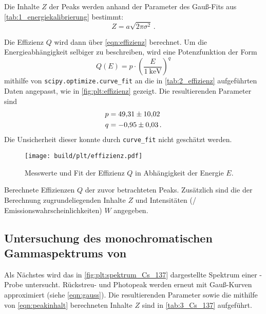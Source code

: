 Die Inhalte $Z$ der Peaks werden anhand der Parameter des Gauß-Fits aus \autoref{tab:1_energiekalibrierung} bestimmt:
\begin{equation}
    Z = a \sqrt{2\pi \sigma^2} \, .
    \label{eqn:peakinhalt}
\end{equation}

 \label{sec:auswertung:effizienz:effizienz}
Die Effizienz $Q$ wird dann über \autoref{eqn:effizienz} berechnet.
Um die Energieabhängigkeit selbiger zu beschreiben,
wird eine Potenzfunktion der Form
\begin{equation*}
    Q(E) = p \cdot \left(\frac{E}{\SI{1}{\kilo\electronvolt}}\right)^q
\end{equation*}
mithilfe von \texttt{scipy.optimize.curve\_fit} an die in \autoref{tab:2_effizienz} aufgeführten Daten angepasst,
wie in \autoref{fig:plt:effizienz} gezeigt.
Die resultierenden Parameter sind
\begin{align*}
    p &= \num{49.31 \pm 10.02} \\
    q &= \num{-0.95 \pm 0.03} \, .
\end{align*}
Die Unsicherheit dieser konnte durch \texttt{curve\_fit} nicht geschätzt werden.

\begin{figure}
    \centering
    \texttt{[image: build/plt/effizienz.pdf]}
    \caption{Messwerte und Fit der Effizienz $Q$ in Abhängigkeit der Energie $E$.}
    \label{fig:plt:effizienz}
\end{figure}

\begin{table}
    \centering
    \caption{
        Berechnete Effizienzen $Q$ der zuvor betrachteten Peaks.
        Zusätzlich sind die der Berechnung zugrundeliegenden
            Inhalte $Z$ und
            Intensitäten (/ Emissionswahrscheinlichkeiten) $W$ \cite{lara}
        angegeben.
    }
    \label{tab:2_effizienz}
\end{table}


\FloatBarrier %
\subsection{Untersuchung des monochromatischen Gammaspektrums von } \label{sec:auswertung:Cs_137}
Als Nächstes wird das
    in \autoref{fig:plt:spektrum_Cs_137} dargestellte
Spektrum einer -Probe untersucht.
Rückstreu- und Photopeak werden erneut mit Gauß-Kurven approximiert
    (siehe \autoref{eqn:gauss}).
Die resultierenden Parameter
    sowie die mithilfe von \autoref{eqn:peakinhalt} berechneten Inhalte $Z$
sind in \autoref{tab:3_Cs_137} aufgeführt.

